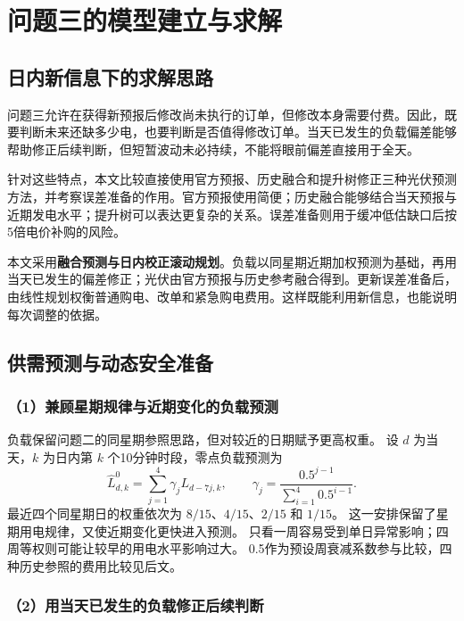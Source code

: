\section{问题三的模型建立与求解}

\subsection{日内新信息下的求解思路}

问题三允许在获得新预报后修改尚未执行的订单，但修改本身需要付费。因此，既要判断未来还缺多少电，也要判断是否值得修改订单。当天已发生的负载偏差能够帮助修正后续判断，但短暂波动未必持续，不能将眼前偏差直接用于全天。

针对这些特点，本文比较直接使用官方预报、历史融合和提升树修正三种光伏预测方法，并考察误差准备的作用。官方预报使用简便；历史融合能够结合当天预报与近期发电水平；提升树可以表达更复杂的关系。误差准备则用于缓冲低估缺口后按5倍电价补购的风险。

本文采用\textbf{融合预测与日内校正滚动规划}。负载以同星期近期加权预测为基础，再用当天已发生的偏差修正；光伏由官方预报与历史参考融合得到。更新误差准备后，由线性规划权衡普通购电、改单和紧急购电费用。这样既能利用新信息，也能说明每次调整的依据。

\subsection{供需预测与动态安全准备}

\subsubsection*{（1）兼顾星期规律与近期变化的负载预测}

负载保留问题二的同星期参照思路，但对较近的日期赋予更高权重。
设 $d$ 为当天，$k$ 为日内第 $k$ 个10分钟时段，零点负载预测为
\begin{equation}
\widehat L^{0}_{d,k}
=\sum_{j=1}^{4}\gamma_jL_{d-7j,k},\qquad
\gamma_j=\frac{0.5^{j-1}}{\sum_{i=1}^{4}0.5^{i-1}}.
\end{equation}
最近四个同星期日的权重依次为 $8/15$、$4/15$、$2/15$ 和 $1/15$。
这一安排保留了星期用电规律，又使近期变化更快进入预测。
只看一周容易受到单日异常影响；四周等权则可能让较早的用电水平影响过大。
0.5作为预设周衰减系数参与比较，四种历史参照的费用比较见后文。

\subsubsection*{（2）用当天已发生的负载修正后续判断}

